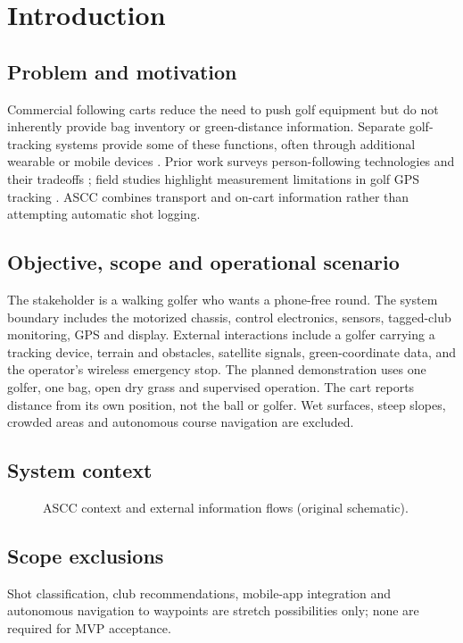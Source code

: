 \section{Introduction}
\subsection{Problem and motivation}
Commercial following carts reduce the need to push golf equipment but do not inherently provide bag inventory or green-distance information. Separate golf-tracking systems provide some of these functions, often through additional wearable or mobile devices \cite{stewart,arccos,arccoswatch}. Prior work surveys person-following technologies and their tradeoffs \cite{hall2025golfGps}; field studies highlight measurement limitations in golf GPS tracking \cite{stewartQFollow}. ASCC combines transport and on-cart information rather than attempting automatic shot logging.
\subsection{Objective, scope and operational scenario}
The stakeholder is a walking golfer who wants a phone-free round. The system boundary includes the motorized chassis, control electronics, sensors, tagged-club monitoring, GPS and display. External interactions include a golfer carrying a tracking device, terrain and obstacles, satellite signals, green-coordinate data, and the operator's wireless emergency stop. The planned demonstration uses one golfer, one bag, open dry grass and supervised operation. The cart reports distance from its own position, not the ball or golfer. Wet surfaces, steep slopes, crowded areas and autonomous course navigation are excluded.
\subsection{System context}
\begin{figure}[ht]\centering
{}\caption{ASCC context and external information flows (original schematic).}\end{figure}
\subsection{Scope exclusions}
Shot classification, club recommendations, mobile-app integration and autonomous navigation to waypoints are stretch possibilities only; none are required for MVP acceptance.\par
